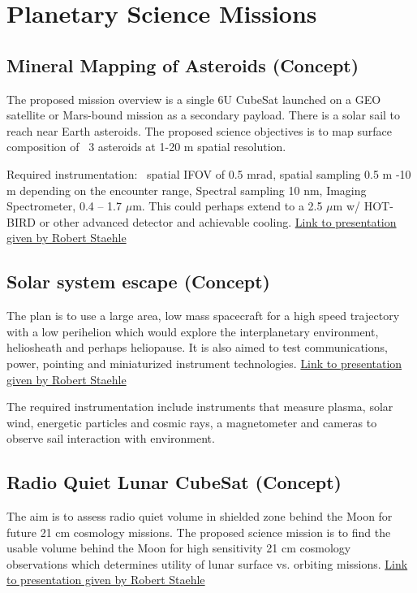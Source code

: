 \section{Planetary Science Missions}

\subsection{Mineral Mapping of Asteroids (Concept)}
\label{min_map}
The proposed mission overview is a single 6U CubeSat launched on a GEO satellite 
or Mars-bound mission as a secondary payload. There is a solar sail to reach near Earth asteroids. The proposed science objectives is to map surface composition of ~3 asteroids at 1-20 m spatial resolution.

Required instrumentation: ~spatial IFOV of 0.5 mrad, spatial sampling 0.5 m -10 m depending on the encounter range, Spectral sampling 10 nm, Imaging Spectrometer, 0.4 – 1.7 $\mu$m. This could perhaps extend to a 2.5 $\mu$m w/ HOT-BIRD or other advanced detector and achievable cooling. \href{http://kiss.caltech.edu/cosponsored/cubesat2012/presentations/staehle-interplanetary-cubesat-missions.pdf}{Link to presentation given by Robert Staehle}

\subsection{Solar system escape (Concept)}
\label{ss_escape}
The plan is to use a large area, low mass spacecraft for a high speed trajectory with a low perihelion which would explore the interplanetary environment, heliosheath and perhaps heliopause. It is also aimed to test communications, power, pointing and miniaturized instrument technologies.  \href{http://kiss.caltech.edu/cosponsored/cubesat2012/presentations/staehle-interplanetary-cubesat-missions.pdf}{Link to presentation given by Robert Staehle}

The required instrumentation include instruments that measure plasma, solar wind, energetic particles and cosmic rays, a magnetometer and cameras to observe sail interaction with environment.


\subsection{Radio Quiet Lunar CubeSat (Concept)}
\label{rqlc}
The aim is to assess radio quiet volume in shielded zone behind the Moon for future 21 cm cosmology missions. The proposed science mission is to find the usable volume behind the Moon for high sensitivity 21 cm cosmology observations which determines utility of lunar surface vs. orbiting missions.  \href{http://kiss.caltech.edu/cosponsored/cubesat2012/presentations/staehle-interplanetary-cubesat-missions.pdf}{Link to presentation given by Robert Staehle}

